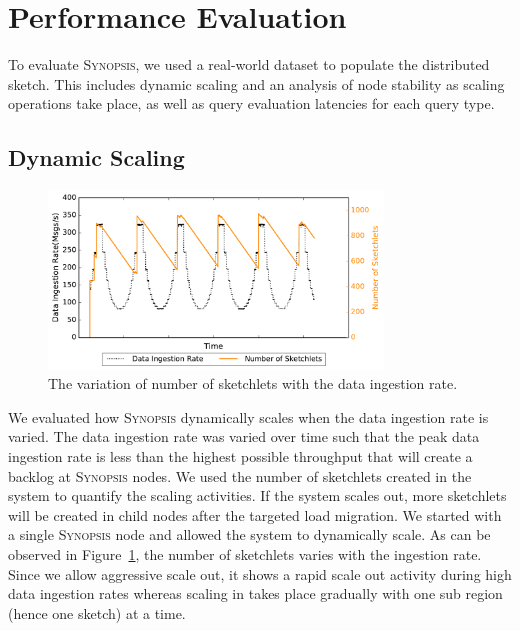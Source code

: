 \section{Performance Evaluation}
\label{sec:performance}
To evaluate \textsc{Synopsis}, we used a real-world dataset to populate the distributed sketch. This includes dynamic scaling and an analysis of node stability as scaling operations take place, as well as query evaluation latencies for each query type.

\subsection{Dynamic Scaling}
\begin{figure}
    \centerline{\includegraphics[width=3.5in]{figures/dyn-scaling.pdf}}
    \caption{The variation of number of sketchlets with the data ingestion rate.}
    \label{fig:dyn-scaling}
\end{figure}
We evaluated how \textsc{Synopsis} dynamically scales when the data ingestion rate is varied.
The data ingestion rate was varied over time such that the peak data ingestion rate is less than the highest possible throughput that will create a backlog at \textsc{Synopsis} nodes.
We used the number of sketchlets created in the system to quantify the scaling activities.
If the system scales out, more sketchlets will be created in child nodes after the targeted load migration.
We started with a single \textsc{Synopsis} node and allowed the system to dynamically scale.
As can be observed in Figure~\ref{fig:dyn-scaling}, the number of sketchlets varies with the ingestion rate.
Since we allow aggressive scale out, it shows a rapid scale out activity during high data ingestion rates whereas scaling in takes place gradually with one sub region (hence one sketch) at a time.
